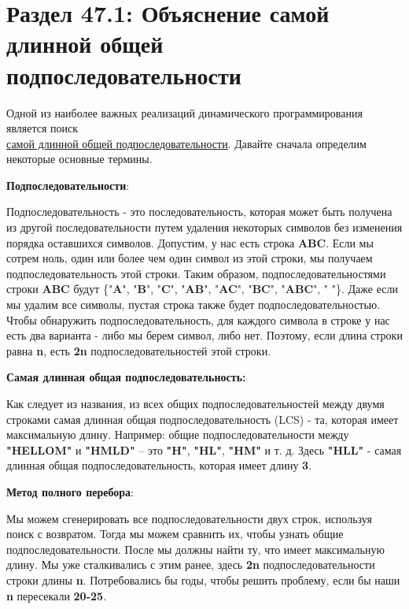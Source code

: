 \section*{Раздел 47.1: Объяснение самой длинной общей подпоследовательности}
Одной из наиболее важных реализаций динамического программирования
является поиск\\ \href{https://en.wikipedia.org/wiki/Longest_common_subsequence_problem}{\underline{самой длинной общей подпоследовательности}}. Давайте
сначала определим некоторые основные термины.
\vspace{\baselineskip}

\textbf{Подпоследовательности}:
\vspace{\baselineskip}

Подпоследовательность - это последовательность, которая может быть
получена из другой последовательности путем удаления некоторых
символов без изменения порядка оставшихся символов. Допустим, у нас есть
строка \textbf{ABC}. Если мы сотрем ноль, один или более чем один символ из этой
строки, мы получаем подпоследовательность этой строки. Таким образом,
подпоследовательностями строки \textbf{ABC} будут \{"\textbf{A}", "\textbf{B}", "\textbf{C}", "\textbf{AB}", "\textbf{AC}", "\textbf{BC}", "\textbf{ABC}", "\textbf{ }"\}. Даже если мы удалим все символы, пустая строка также будет
подпоследовательностью. Чтобы обнаружить подпоследовательность, для
каждого символа в строке у нас есть два варианта - либо мы берем символ, либо нет.
Поэтому, если длина строки равна \textbf{n}, есть \textbf{2n} 
подпоследовательностей этой строки.
\vspace{\baselineskip}

\textbf{Самая длинная общая подпоследовательность:}
\vspace{\baselineskip}

Как следует из названия, из всех общих подпоследовательностей между
двумя строками самая длинная общая подпоследовательность (LCS) - та,
которая имеет максимальную длину. Например: общие
подпоследовательности между \textbf{"HELLOM"} и \textbf{"HMLD"} – это \textbf{"H"}, \textbf{"HL"}, \textbf{"HM"} и т.
д. Здесь \textbf{"HLL"} - самая длинная общая подпоследовательность, которая имеет
длину \textbf{3}.
\vspace{\baselineskip}

\textbf{Метод полного перебора}:
\vspace{\baselineskip}

Мы можем сгенерировать все подпоследовательности двух строк, используя
поиск с возвратом. Тогда мы можем сравнить их, чтобы узнать общие
подпоследовательности. После мы должны найти ту, что имеет
максимальную длину. Мы уже сталкивались с этим ранее, здесь \textbf{2n}
подпоследовательности строки длины \textbf{n}. Потребовались бы годы, чтобы
решить проблему, если бы наши \textbf{n} пересекали \textbf{20-25}.
\vspace{\baselineskip}

